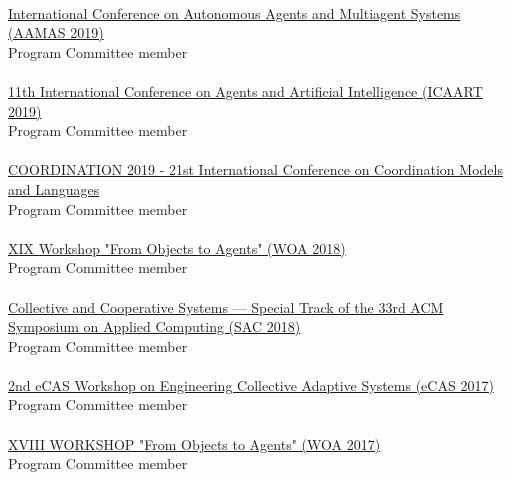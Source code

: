 \halfblankline \\
\href{http://aamas2019.encs.concordia.ca/}{International Conference on Autonomous Agents and 
Multiagent Systems (AAMAS 2019)}
\\ Program Committee member \\
\halfblankline \\
\href{http://www.icaart.org/?y=2019}{11th International Conference on Agents and Artificial Intelligence 
(ICAART 2019)}
\\ Program Committee member \\
\halfblankline \\
\href{http://www.discotec.org/2019/coordination}{COORDINATION 2019 - 21st International Conference on Coordination Models and Languages}
\\ Program Committee member \\
\halfblankline \\
\href{http://diid.unipa.it/roboticslab/woa2018/}{XIX Workshop "From Objects to Agents" (WOA 2018)}
\\ Program Committee member \\
\halfblankline \\
\href{http://sac-cas2018.apice.unibo.it/referees.html}{Collective and Cooperative Systems --- Special Track of the 33rd ACM Symposium on Applied Computing (SAC 2018)}
\\ Program Committee member \\
\halfblankline \\
\href{http://apice.unibo.it/xwiki/bin/view/ECAS2017/WebHome}{2nd eCAS Workshop on Engineering Collective Adaptive Systems (eCAS 2017)}
\\ Program Committee member \\
\halfblankline \\
\href{http://woa2017.unirc.it/}{XVIII WORKSHOP "From Objects to Agents" (WOA 2017)}
\\ Program Committee member \\
